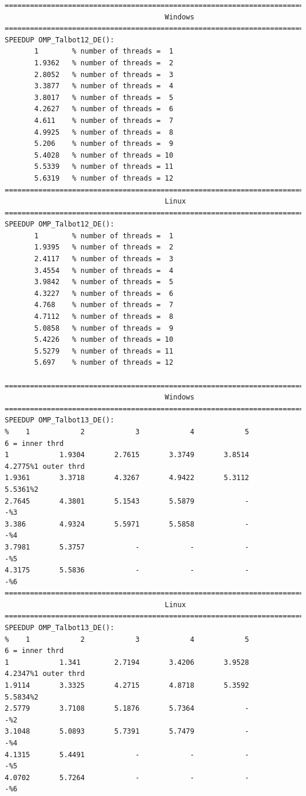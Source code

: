 \documentclass[a4paper,10pt]{report}%
\begin{document}
\begin{lstlisting}
====================================================================================
                                      Windows
====================================================================================
SPEEDUP OMP_Talbot12_DE():
       1        % number of threads =  1
       1.9362   % number of threads =  2
       2.8052   % number of threads =  3
       3.3877   % number of threads =  4
       3.8017   % number of threads =  5
       4.2627   % number of threads =  6
       4.611    % number of threads =  7
       4.9925   % number of threads =  8
       5.206    % number of threads =  9
       5.4028   % number of threads = 10
       5.5339   % number of threads = 11
       5.6319   % number of threads = 12
====================================================================================
                                      Linux
====================================================================================
SPEEDUP OMP_Talbot12_DE():
       1        % number of threads =  1
       1.9395   % number of threads =  2
       2.4117   % number of threads =  3
       3.4554   % number of threads =  4
       3.9842   % number of threads =  5
       4.3227   % number of threads =  6
       4.768    % number of threads =  7
       4.7112   % number of threads =  8
       5.0858   % number of threads =  9
       5.4226   % number of threads = 10
       5.5279   % number of threads = 11
       5.697    % number of threads = 12

====================================================================================
                                      Windows
====================================================================================
SPEEDUP OMP_Talbot13_DE():
%    1            2            3            4            5            6 = inner thrd
1            1.9304       2.7615       3.3749       3.8514       4.2775%1 outer thrd
1.9361       3.3718       4.3267       4.9422       5.3112       5.5361%2
2.7645       4.3801       5.1543       5.5879            -            -%3
3.386        4.9324       5.5971       5.5858            -            -%4
3.7981       5.3757            -            -            -            -%5
4.3175       5.5836            -            -            -            -%6
====================================================================================
                                      Linux
====================================================================================
SPEEDUP OMP_Talbot13_DE():
%    1            2            3            4            5            6 = inner thrd
1            1.341        2.7194       3.4206       3.9528       4.2347%1 outer thrd
1.9114       3.3325       4.2715       4.8718       5.3592       5.5834%2
2.5779       3.7108       5.1876       5.7364            -            -%2
3.1048       5.0893       5.7391       5.7479            -            -%4
4.1315       5.4491            -            -            -            -%5
4.0702       5.7264            -            -            -            -%6
\end{lstlisting}
\end{document}
